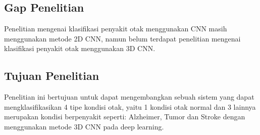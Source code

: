 \subsection{Gap Penelitian}
Penelitian mengenai klasifikasi penyakit otak  menggunakan CNN masih menggunakan metode 2D CNN, namun belum terdapat penelitian mengenai klasifikasi penyakit otak menggunakan 3D CNN.

\subsection{Tujuan Penelitian}

Penelitian ini bertujuan untuk dapat mengembangkan sebuah sistem yang dapat mengklasifikasikan 4 tipe kondisi otak, yaitu 1 kondisi otak normal dan 3 lainnya merupakan kondisi berpenyakit seperti: Alzheimer, Tumor dan Stroke dengan menggunakan metode 3D CNN pada deep learning.